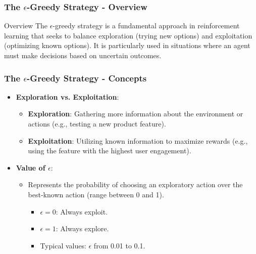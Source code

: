 \documentclass[aspectratio=169]{beamer}
\begin{document}
\begin{frame}[fragile]
    \frametitle{The $\epsilon$-Greedy Strategy - Overview}
    \begin{block}{Overview}
        The $\epsilon$-greedy strategy is a fundamental approach in reinforcement learning that seeks to balance exploration (trying new options) and exploitation (optimizing known options).
        It is particularly used in situations where an agent must make decisions based on uncertain outcomes.
    \end{block}
\end{frame}

\begin{frame}[fragile]
    \frametitle{The $\epsilon$-Greedy Strategy - Concepts}
    \begin{itemize}
        \item \textbf{Exploration vs. Exploitation}:
        \begin{itemize}
            \item \textbf{Exploration}: Gathering more information about the environment or actions (e.g., testing a new product feature).
            \item \textbf{Exploitation}: Utilizing known information to maximize rewards (e.g., using the feature with the highest user engagement).
        \end{itemize}
        
        \item \textbf{Value of $\epsilon$}:
        \begin{itemize}
            \item Represents the probability of choosing an exploratory action over the best-known action (range between 0 and 1).
            \begin{itemize}
                \item $\epsilon = 0$: Always exploit.
                \item $\epsilon = 1$: Always explore.
                \item Typical values: $\epsilon$ from 0.01 to 0.1.
            \end{itemize}
        \end{itemize}
    \end{itemize}
\end{frame}
\end{document}
